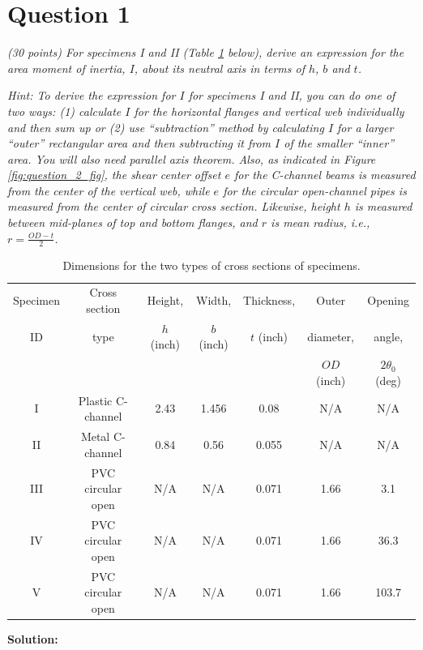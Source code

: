 \documentclass[12 pt]{article}
\newcommand{\ie}{\textit{i}.\textit{e}., }
\begin{document}
\section*{Question 1}
\textit{(\num{30} points) For specimens I and II (Table \ref{tbl:question_1_table} below), derive an expression for the area moment of inertia, $I$, about its neutral axis in terms of $h$, $b$ and $t$.}

\textit{Hint: To derive the expression for $I$ for specimens I and II, you can do one of two ways: (\num{1}) calculate $I$ for the horizontal flanges and vertical web individually and then sum up or (\num{2}) use ``subtraction'' method by calculating $I$ for a larger ``outer'' rectangular area and then subtracting it from $I$ of the smaller ``inner'' area. You will also need parallel axis theorem. Also, as indicated in Figure \ref{fig:question_2_fig}, the shear center offset $e$ for the C-channel beams is measured from the center of the vertical web, while $e$ for the circular open-channel pipes is measured from the center of circular cross section. Likewise, height $h$ is measured between mid-planes of top and bottom flanges, and $r$ is mean radius, \ie $r=\frac{OD-t}{2}$.}

\begin{table}[!htbp]
\caption{Dimensions for the two types of cross sections of specimens.}
\begin{center}
	\begin{tabular}{|c|c|c|c|c|c|c|}
		\hline
		Specimen &Cross section &Height, &Width, &Thickness, &Outer &Opening \\
		ID&type&$h$ (\unit{inch})&$b$ (\unit{inch})&$t$ (\unit{inch})&diameter, &angle, \\
		&&&&&$OD$ (\unit{inch})&$2\theta_0$ (\unit{deg})\\
		\hline
		I&Plastic C-channel&2.43&1.456&0.08&N/A&N/A\\
		\hline
		II&Metal C-channel&0.84&0.56&0.055&N/A&N/A\\
		\hline
		III&PVC circular open&N/A&N/A&0.071&1.66&3.1\\
		\hline
		IV&PVC circular open&N/A&N/A&0.071&1.66&36.3\\
		\hline
		V&PVC circular open&N/A&N/A&0.071&1.66&103.7\\
		\hline
	\end{tabular}
\end{center}
\label{tbl:question_1_table}
\end{table}

\textbf{Solution:}
\end{document}
